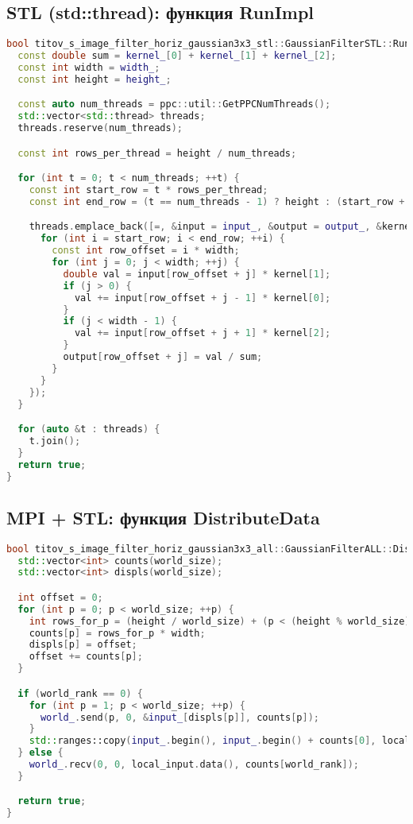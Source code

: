 \documentclass[12pt]{article}
\begin{document}
\subsection*{STL (std::thread): функция RunImpl}
\begin{lstlisting}[language=C++]
bool titov_s_image_filter_horiz_gaussian3x3_stl::GaussianFilterSTL::RunImpl() {
  const double sum = kernel_[0] + kernel_[1] + kernel_[2];
  const int width = width_;
  const int height = height_;

  const auto num_threads = ppc::util::GetPPCNumThreads();
  std::vector<std::thread> threads;
  threads.reserve(num_threads);

  const int rows_per_thread = height / num_threads;

  for (int t = 0; t < num_threads; ++t) {
    const int start_row = t * rows_per_thread;
    const int end_row = (t == num_threads - 1) ? height : (start_row + rows_per_thread);

    threads.emplace_back([=, &input = input_, &output = output_, &kernel = kernel_] {
      for (int i = start_row; i < end_row; ++i) {
        const int row_offset = i * width;
        for (int j = 0; j < width; ++j) {
          double val = input[row_offset + j] * kernel[1];
          if (j > 0) {
            val += input[row_offset + j - 1] * kernel[0];
          }
          if (j < width - 1) {
            val += input[row_offset + j + 1] * kernel[2];
          }
          output[row_offset + j] = val / sum;
        }
      }
    });
  }

  for (auto &t : threads) {
    t.join();
  }
  return true;
}
\end{lstlisting}

\subsection*{MPI + STL: функция DistributeData}
\begin{lstlisting}[language=C++]
bool titov_s_image_filter_horiz_gaussian3x3_all::GaussianFilterALL::DistributeData(int world_rank, int world_size, int height, int width, int start_row, int end_row, std::vector<double> &local_input) {
  std::vector<int> counts(world_size);
  std::vector<int> displs(world_size);

  int offset = 0;
  for (int p = 0; p < world_size; ++p) {
    int rows_for_p = (height / world_size) + (p < (height % world_size) ? 1 : 0);
    counts[p] = rows_for_p * width;
    displs[p] = offset;
    offset += counts[p];
  }

  if (world_rank == 0) {
    for (int p = 1; p < world_size; ++p) {
      world_.send(p, 0, &input_[displs[p]], counts[p]);
    }
    std::ranges::copy(input_.begin(), input_.begin() + counts[0], local_input.begin());
  } else {
    world_.recv(0, 0, local_input.data(), counts[world_rank]);
  }

  return true;
}
\end{lstlisting}
\end{document}
